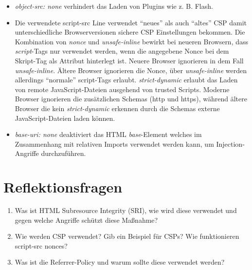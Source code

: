 \begin{itemize}
	\item \textit{object-src: none} verhindert das Laden von Plugins wie z. B. Flash.
	\item Die verwendete script-src Line verwendet ``neues'' als auch ``altes'' CSP damit unterschiedliche Browserversionen sichere CSP Einstellungen bekommen. Die Kombination von \textit{nonce} und \textit{unsafe-inline} bewirkt bei neueren Browsern, dass \textit{script}-Tags nur verwendet werden, wenn die angegebene Nonce bei dem Skript-Tag als Attribut hinterlegt ist. Neuere Browser ignorieren in dem Fall \textit{unsafe-inline}. Ältere Browser ignorieren die Nonce, über \textit{unsafe-inline} werden allerdings ``normale'' script-Tags erlaubt. \textit{strict-dynamic} erlaubt das Laden von remote JavaScript-Dateien ausgehend von trusted Scripts. Moderne Browser ignorieren die zusätzlichen Schemas (http und https), während ältere Browser die kein \textit{strict-dynamic} erkennen durch die Schemas externe JavaScript-Dateien laden können.
	\item \textit{base-uri: none} deaktiviert das HTML \textit{base}-Element welches im Zusammenhang mit relativen Imports verwendet werden kann, um Injection-Angriffe durchzuführen.
\end{itemize}

\section{Reflektionsfragen}

\begin{enumerate}
	\item Was ist HTML Subresource Integrity (SRI), wie wird diese verwendet und gegen welche Angriffe schützt diese Maßnahme?
	\item Wie werden CSP verwendet? Gib ein Beispiel für CSPs? Wie funktionieren script-src nonces?
	\item Was ist die Referrer-Policy und warum sollte diese verwendet werden?
\end{enumerate}
